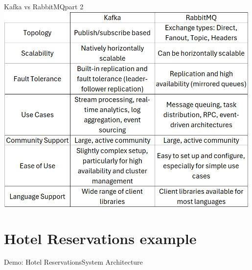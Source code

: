 \documentclass{beamer}
\begin{document}
\begin{frame}{Kafka vs RabbitMQ}{part 2}
  \includegraphics[width=0.99\textwidth]{fig/vs2.png}
\end{frame}


\section[Hotel Reservations example]{Hotel Reservations example}


\begin{frame}{Demo: Hotel Reservations}{System Architecture}
\end{frame}
\end{document}
